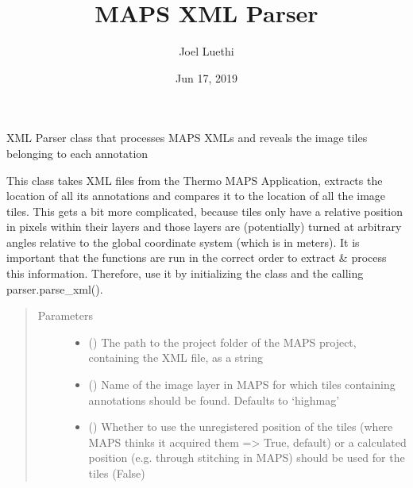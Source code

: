 \documentclass[letterpaper,10pt,english]{sphinxmanual}
\title{MAPS XML Parser}
\date{Jun 17, 2019}
\author{Joel Luethi}
\begin{document}
\pagestyle{empty}
\sphinxmaketitle
\pagestyle{plain}
\sphinxtableofcontents
\pagestyle{normal}
\label{\detokenize{index::doc}}


\begin{fulllineitems}
\label{\detokenize{index:sites_of_interest_parser.MapsXmlParser}}
XML Parser class that processes MAPS XMLs and reveals the image tiles belonging to each annotation

This class takes XML files from the Thermo MAPS Application, extracts the location of all its annotations and
compares it to the location of all the image tiles. This gets a bit more complicated, because tiles only have a
relative position in pixels within their layers and those layers are (potentially) turned at arbitrary angles
relative to the global coordinate system (which is in meters).
It is important that the functions are run in the correct order to extract \& process this information. Therefore,
use it by initializing the class and the calling parser.parse\_xml().
\begin{quote}\begin{description}
\item[{Parameters}] \leavevmode\begin{itemize}
\item {} 
 () \textendash{} The path to the project folder of the MAPS project, containing the XML file, as a string

\item {} 
 () \textendash{} Name of the image layer in MAPS for which tiles containing annotations should
be found. Defaults to ‘highmag’

\item {} 
 () \textendash{} Whether to use the unregistered position of the tiles (where MAPS thinks it
acquired them =\textgreater{} True, default) or a calculated position (e.g. through stitching in MAPS) should be used for
the tiles (False)


\end{itemize}
\end{description}
\end{quote}
\end{fulllineitems}
\end{document}
